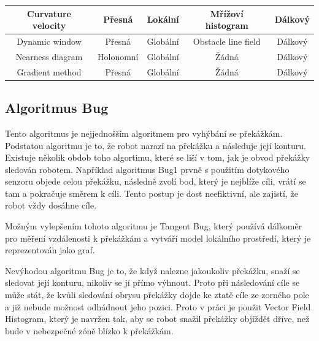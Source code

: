 \documentclass[twoside]{ctuthesis}
\theoremstyle{plain}
\theoremstyle{definition}
\theoremstyle{note}
\begin{document}
\begin{table}[hbt]
\begin{tabular}{|c|c|c|c|c|}
		Curvature velocity                               & Přesná                                               & Lokální                                                    & Mřížoví histogram                                                  & Dálkový                                                    \\ \hline
		Dynamic window                                   & Přesná                                               & Globální                                                   & Obstacle line field                                                & Dálkový                                                    \\ \hline
		Nearness diagram                                 & Holonomní                                            & Globální                                                   & Žádná                                                              & Dálkový                                                    \\ \hline
		Gradient method                                  & Přesná                                               & Globální                                                   & Žádná                                                              & Dálkový                                                    \\ \hline
	\end{tabular}
\end{table}

\subsection{Algoritmus Bug}

Tento algoritmus je nejjednošším algoritmem pro vyhýbání se překážkám. Podstatou algoritmu je to, že robot narazí na překážku a následuje její konturu. Existuje několik obdob toho algortimu, které se liší v tom, jak je obvod překážky sledován robotem. Například algoritmus Bug1 prvně s použitím dotykového senzoru objede celou překážku, následně zvolí bod, který je nejblíže cíli, vrátí se tam a pokračuje směrem k cíli. Tento postup je dost neefiktivní, ale zajistí, že robot vždy dosáhne cíle.

Možným vylepšením tohoto algoritmu je Tangent Bug, který používá dálkoměr pro měření vzdálenosti k překážkám a vytváří model lokálního prostředí, který je reprezentován jako graf. 

Nevýhodou algoritmu Bug je to, že když nalezne jakoukoliv překážku, snaží se sledovat její konturu, nikoliv se jí přímo výhnout. Proto při následování cíle se může stát, že kvůli sledování obrysu překážky dojde ke ztatě cíle ze zorného pole a již nebude možnost odhádnout jeho pozici. Proto v práci je použit Vector Field Histogram, který je navržen tak, aby se robot snažil překážky objíždět dříve, než bude v nebezpečné zóně blízko k překážkám. 
\end{document}
